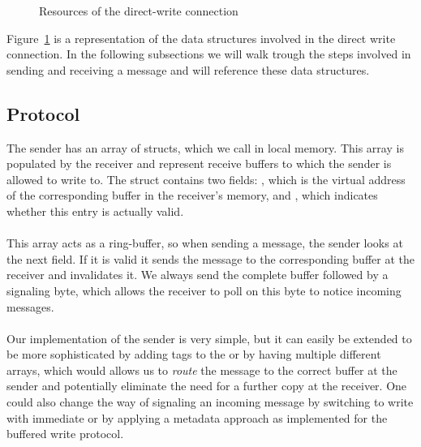 \begin{figure}[!htb]
\begin{center}
\end{center}
\caption{Resources of the direct-write connection}
\label{fig:dirwrite-resources}
\end{figure}

Figure~\ref{fig:dirwrite-resources} is a representation of the data structures involved in the direct write 
connection. In the following subsections we will walk trough the steps involved in sending and receiving a message and
will reference these data structures.

\subsection{Protocol}

The sender has an array of structs, which we call  in local memory. This array is populated by the 
receiver and represent receive buffers to which the sender is allowed to write to. The struct contains two fields: 
, which is the virtual address of the corresponding buffer in the receiver's memory, and , which 
indicates whether this entry is actually valid. 

\paragraph{} This array acts as a ring-buffer, so when sending a message, the sender looks at the next field. If it is
valid it sends the message to the corresponding buffer at the receiver and invalidates it. We always send the complete
buffer followed by a signaling byte, which allows the receiver to poll on this byte to notice incoming messages.

\paragraph{} Our implementation of the sender is very simple, but it can easily be extended to be more sophisticated by adding
tags to the  or by having multiple different arrays, which would allows us to \emph{route} the message to the
correct buffer at the sender and potentially eliminate the need for a further copy at the receiver. One could also change
the way of signaling an incoming message by switching to write with immediate or by applying a metadata approach as implemented
for the buffered write protocol.


